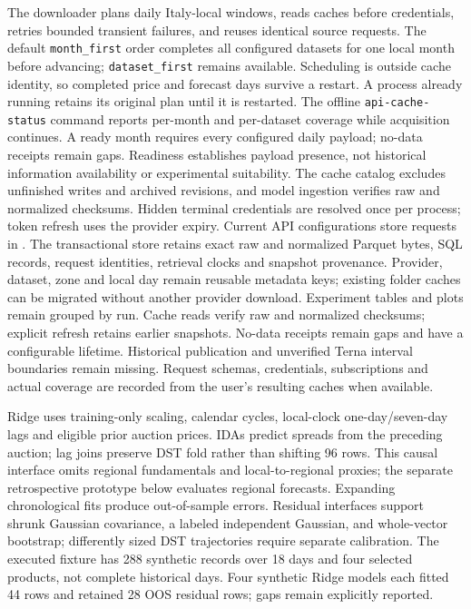 \documentclass[11pt,a4paper]{article}
\begin{document}
The downloader plans daily Italy-local windows, reads caches before credentials,
retries bounded transient failures, and reuses identical source requests. The
default \texttt{month\_first} order completes all configured datasets for one local
month before advancing; \texttt{dataset\_first} remains available. Scheduling is
outside cache identity, so completed price and forecast days survive a restart.
A process already running retains its original plan until it is restarted.
The offline \texttt{api-cache-status} command reports per-month and per-dataset
coverage while acquisition continues. A ready month requires every configured
daily payload; no-data receipts remain gaps. Readiness establishes payload
presence, not historical information availability or experimental suitability.
The cache catalog excludes unfinished writes and archived revisions, and model
ingestion verifies raw and normalized checksums. Hidden
terminal credentials are resolved once per process; token refresh uses the provider
expiry. Current API configurations store requests in .
The transactional store retains exact raw and normalized Parquet bytes, SQL
records, request identities, retrieval clocks and snapshot provenance. Provider,
dataset, zone and local day remain reusable metadata keys; existing folder caches
can be migrated without another provider download. Experiment tables and plots
remain grouped by run. Cache reads verify raw and normalized checksums;
explicit refresh retains earlier snapshots. No-data receipts remain gaps and
have a configurable lifetime. Historical publication and unverified Terna interval
boundaries remain missing. Request schemas, credentials, subscriptions and actual
coverage are recorded from the user's resulting caches when available.

Ridge uses training-only scaling, calendar cycles, local-clock one-day/seven-day
lags and eligible prior auction prices. IDAs predict spreads from the preceding
auction; lag joins preserve DST fold rather than shifting 96 rows. This causal
interface omits regional fundamentals and local-to-regional proxies; the separate
retrospective prototype below evaluates regional forecasts. Expanding chronological
fits produce out-of-sample errors. Residual interfaces support shrunk Gaussian
covariance, a labeled independent Gaussian, and whole-vector bootstrap; differently
sized DST trajectories require separate calibration. The executed fixture has
288 synthetic records over 18 days and four selected products, not complete
historical days. Four synthetic Ridge models each fitted 44 rows and retained
28 OOS residual rows; gaps remain explicitly reported.
\end{document}
